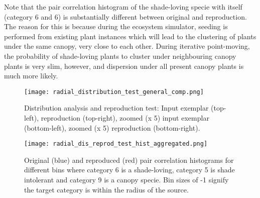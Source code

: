Note that the pair correlation histogram of the shade-loving specie with itself (category 6 and 6) is substantially different between original and reproduction. The reason for this is because during the ecosystem simulator, seeding is performed from existing plant instances which will lead to the clustering of plants under the same canopy, very close to each other. During iterative point-moving, the probability of shade-loving plants to cluster under neighbouring canopy plants is very slim, however, and dispersion under all present canopy plants is much more likely.

\begin{figure}
\center
	\texttt{[image: radial\_distribution\_test\_general\_comp.png]}
	\caption{ Distribution analysis and reproduction test: Input exemplar (top-left), reproduction (top-right), zoomed (x 5) input exemplar (bottom-left), zoomed (x 5) reproduction (bottom-right). }	
	\label{fig:radial_dist_test}
\end{figure}

\begin{figure}
\center
	\texttt{[image: radial\_dis\_reprod\_test\_hist\_aggregated.png]}
	\caption{ Original (blue) and reproduced (red) pair correlation histograms for different bins where category 6 is a shade-loving, category 5 is shade intolerant and category 9 is a canopy specie. Bin sizes of -1 signify the target category is within the radius of the source.}	
	\label{fig:hisogram_comp}
\end{figure}
